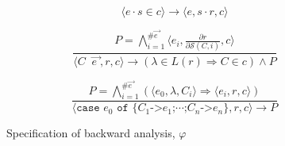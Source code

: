 \documentclass[preprint]{sigplanconf}
\newcommand{\T}[1]{\texttt{#1}}
\newcommand{\tup}[1]{\ensuremath{\langle #1 \rangle}}
\newcommand{\D}{\ensuremath{\cdot}} %
\newcommand{\vecto}[1]{\overrightarrow{#1\;}}
\newcommand{\gap}{\;\;}
\begin{document}
\begin{figure}

\renewcommand\theequation{sel}
\begin{equation}
    \tup{e\D{}s \in c} \rightarrow
    \tup{e,s\D{}r,c}
\end{equation}

\renewcommand\theequation{con}
\begin{equation}
\frac
    {
        P =
        \bigwedge_{i=1}^{\#\vecto{e}}
        \tup{e_i,\frac{\partial r}{\partial \mathcal{S}(C,i)},c}
    }
    {
        \tup{C \gap \vecto{e},r,c}
        \rightarrow (\lambda \in L(r) \Rightarrow C \in c) \wedge P
    }
\end{equation}

\renewcommand\theequation{cas}
\begin{equation}
\frac
    {
        P =
        \bigwedge_{i=1}^{\#\vecto{e}}
        (
            \tup{e_0,\lambda,C_i}
            \Rightarrow
            \tup{e_i,r,c}
        )
    }
    {
        \tup{\T{case } e_0 \T{ of \{}C_1 \T{->} e_1\T{;} \cdots
        \T{;} C_n \T{->} e_n \},r,c} \rightarrow P
    }
\end{equation}

\caption{Specification of backward analysis, $\varphi$} %
\label{fig:backward}
\end{figure}
\end{document}
